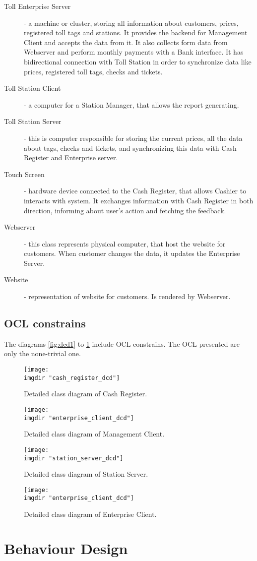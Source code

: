 \begin{description}
\item[Toll Enterprise Server] - a machine or cluster, storing all information about customers, prices, registered toll tags and stations. It provides the backend for Management Client and accepts the data from it. It also collects form data from Webserver and perform monthly payments with a Bank interface. It has bidirectional connection with Toll Station in order to synchronize data like prices, registered toll tags, checks and tickets. 
\item [Toll Station Client] - a computer for a Station Manager, that allows the report generating.
\item [Toll Station Server] - this is computer responsible for storing the current prices, all the data about tags, checks and tickets, and synchronizing this data with Cash Register and Enterprise server.
\item [Touch Screen] - hardware device connected to the Cash Register, that allows Cashier to interacts with system. It exchanges information with Cash Register in both direction, informing about user's action and fetching the feedback. 
\item[Webserver] - this class represents physical computer, that host the website for customers. When customer changes the data, it updates the Enterprise Server.
\item[Website] - representation of website for customers. Is rendered by Webserver.
\end{description}

\subsection{OCL constrains}
The diagrams \ref{fig:dcd1} to \ref{fig:dcd_ec} include OCL constrains. The OCL presented are only the none-trivial one. 
\begin{figure}
  \centering
  \texttt{[image: \\imgdir "cash\_register\_dcd"]}
  \caption{Detailed class diagram of Cash Register.}
  \label{fig:dcd_cr}
  \texttt{[image: \\imgdir "enterprise\_client\_dcd"]}
  \caption{Detailed class diagram of Management Client.}
  \label{fig:dcd_mc}
  \texttt{[image: \\imgdir "station\_server\_dcd"]}
  \caption{Detailed class diagram of Station Server.}
  \label{fig:dcd_ss}
  \texttt{[image: \\imgdir "enterprise\_client\_dcd"]}
  \caption{Detailed class diagram of Enterprise Client.}
  \label{fig:dcd_ec}
\end{figure}

\section{Behaviour Design}
